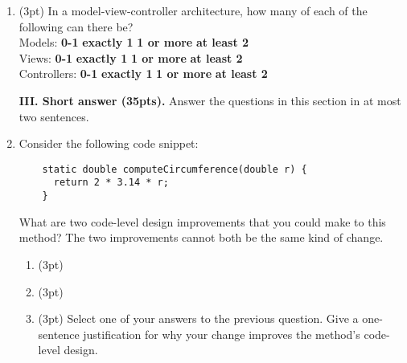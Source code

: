 \documentclass{report}
\newif\ifkey
\newcommand{\correct}[1]{\ifkey\color{red}\textbf{#1}\color{black}\else\textbf{#1}\fi\xspace}
\newcommand{\answershort}[1]{\ifkey\color{red}\underline{\textbf{#1}}\color{black}\else\underline{\hspace{3in}}\fi\xspace}
\newcommand{\answerlong}[1]{\ifkey\color{red}\textbf{#1}\color{black}\else\vspace{0.5in}\fi\xspace}
\newcommand{\shortpts}{35}
\newcommand*{\pts}[1]{\addtocounter{points}{#1}(#1pt)}
\begin{document}
\begin{spacing}{1.4}
\begin{enumerate}[leftmargin=*]
   \item \pts{3} In a model-view-controller architecture, how many of each of the following can there be?
     \\ Models: \hspace{0.75in} \textbf{0-1} \hspace{0.5in} \correct{exactly 1} \hspace{0.5in} \textbf{1 or more} \hspace{0.5in} \textbf{at least 2}
     \\ Views: \hspace{0.82in} \textbf{0-1} \hspace{0.5in} \textbf{exactly 1} \hspace{0.5in} \correct{1 or more} \hspace{0.5in} \textbf{at least 2}
     \\ Controllers: \hspace{0.51in} \textbf{0-1} \hspace{0.5in} \textbf{exactly 1} \hspace{0.5in} \correct{1 or more} \hspace{0.5in} \textbf{at least 2}
     
  \newpage

  \textbf{III. Short answer (\shortpts pts).} Answer the questions in this section in at most two sentences.

\item Consider the following code snippet: \\
  \begin{lstlisting}
    static double computeCircumference(double r) {
      return 2 * 3.14 * r;
    }
  \end{lstlisting}

  What are two code-level design improvements that you could make to this method? The two improvements cannot both be the same kind of change.
  \begin{enumerate}
  \item \pts{3} \answershort{replace 3.14 with a PI constant} 
  \item \pts{3} \answershort{rename ``r'' to ``radius'' or rename ``computeCircumference'' to ``circumference''}

  \item \pts{3} Select one of your answers to the previous question. Give a one-sentence justification for why your change
  improves the method's code-level design.

  \answerlong{For 1. above: ``avoid magic numbers'' or ``more self-documenting''. For 2. above: ``radius'' is more descriptive than ``r'', or ``compute'' is a verb, but the method returns a noun-like type.}


\end{enumerate}
\end{enumerate}
\end{spacing}
\end{document}
